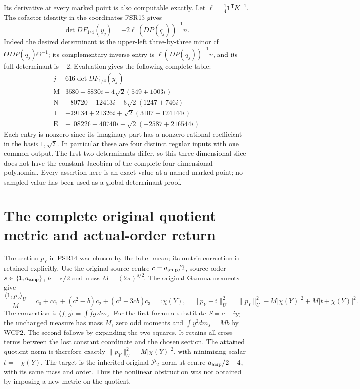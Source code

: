 \documentclass[11pt]{article}
\begin{document}
Its derivative at every marked point is also computable exactly.
Let $\ell=\tfrac14\mathbf1^{\mathsf T}K^{-1}$. The cofactor
identity in the coordinates FSR13 gives
\[
 \det DF_{1/4}(y_j)=-2\ell\,(DP(q_j))^{-1}n.
 \tag{FSR18}
\]
Indeed the desired determinant is the upper-left three-by-three
minor of $\Theta DP(q_j)\Theta^{-1}$; its complementary inverse
entry is $\ell(DP(q_j))^{-1}n$, and its full determinant is $-2$.
Evaluation gives the following complete table:
\[
\begin{array}{c|l}
 j&616\det DF_{1/4}(y_j)\\\hline
 \mathrm M&3580+8830i-4\sqrt2(549+1003i)\\
 \mathrm N&-80720-12413i-8\sqrt2(1247+746i)\\
 \mathrm T&-39134+21326i+\sqrt2(3107-124144i)\\
 \mathrm E&-108226+40740i+\sqrt2(-2587+216544i)
\end{array}\tag{FSR19}
\]
Each entry is nonzero since its imaginary part has a nonzero rational
coefficient in the basis $1,\sqrt2$. In particular these are four
distinct regular inputs with one common output. The first two
determinants differ, so this three-dimensional slice does not have
the constant Jacobian of the complete four-dimensional polynomial.
Every assertion here is an exact value at a named marked point;
no sampled value has been used as a global determinant proof.

\section{The complete original quotient metric and actual-order return}
The section $p_Y$ in FSR14 was chosen by the label mean; its metric
correction is retained explicitly. Use the original source centre
$c=a_{\rm amp}/2$, source order $s\in\{1,a_{\rm amp}\}$,
$b=s/2$ and mass $M=(2\pi)^{s/2}$. The original Gamma moments give
\[
 \frac{\langle1,p_Y\rangle_U}{M}
  =c_0+cc_1+(c^2-b)c_2+(c^3-3cb)c_3=:\chi(Y),
 \quad
 \|p_Y+t\|_U^2=
 \|p_Y\|_U^2-M|\chi(Y)|^2+M|t+\chi(Y)|^2.
 \tag{FSR20}
\]
The convention is $\langle f,g\rangle=\int\bar f g\,dm_s$.
For the first formula substitute $S=c+iy$; the unchanged measure
has mass $M$, zero odd moments and $\int y^2dm_s=Mb$ by WCF2.
The second follows by expanding the two squares. It retains all
cross terms between the lost constant coordinate and the chosen
section. The attained quotient norm is therefore exactly
$\|p_Y\|_U^2-M|\chi(Y)|^2$, with minimizing scalar $t=-\chi(Y)$.
The target is the inherited original $\mathcal P_2$ norm at centre
$a_{\rm amp}/2-4$, with its same mass and order. Thus the nonlinear
obstruction was not obtained by imposing a new metric on the quotient.
\end{document}
